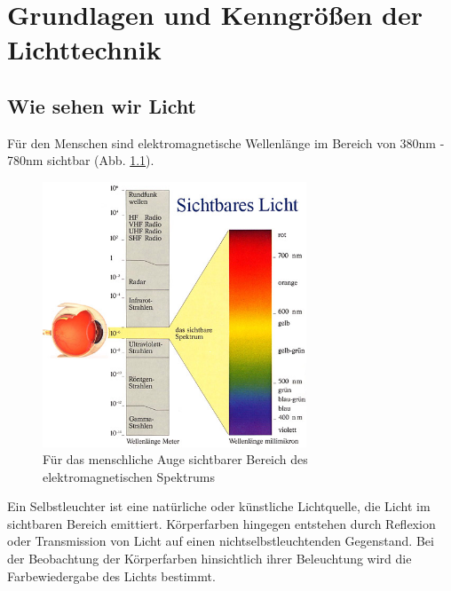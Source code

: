 \chapter{Grundlagen und Kenngrößen der Lichttechnik}



\section{Wie sehen wir Licht} \label{sec_wiesehenwir}
Für den Menschen sind elektromagnetische Wellenlänge im Bereich von 380nm - 780nm sichtbar (Abb. \ref{b_sichtbareslicht}). 

\begin{figure}[htp]     %
\centering
\includegraphics[width=0.7\textwidth]{bilder/sichtbares_licht} 
\caption {Für das menschliche Auge sichtbarer Bereich des elektromagnetischen Spektrums\protect\footnotemark}\label{b_sichtbareslicht}
\end{figure}


Ein Selbstleuchter ist eine natürliche oder künstliche Lichtquelle, die Licht im sichtbaren Bereich emittiert. Körperfarben hingegen entstehen durch Reflexion oder Transmission von Licht auf einen nichtselbstleuchtenden Gegenstand. Bei der Beobachtung der Körperfarben hinsichtlich ihrer Beleuchtung wird die Farbewiedergabe des Lichts bestimmt\citep[S.103]{hentschel}.



